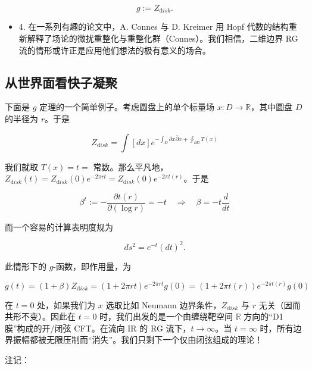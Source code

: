 \documentclass[11pt,a4paper]{ctexart}
\begin{document}
\[g:= Z_{\mathrm disk} .\]

\begin{itemize}
\tightlist
\item
  4. 在一系列有趣的论文中，A. Connes 与 D. Kreimer 用 Hopf 代数的结构重新解释了场论的微扰重整化与重整化群（Connes）。我们相信，二维边界 RG 流的情形或许正是应用他们想法的极有意义的场合。
\end{itemize}

\subsection{从世界面看快子凝聚}\label{ux4eceux4e16ux754cux9762ux770bux5febux5b50ux51ddux805a}

下面是 \(g\) 定理的一个简单例子。考虑圆盘上的单个标量场 \(x:D \to \mathbb{R}\)，其中圆盘 \(D\) 的半径为 \(r\)。于是

\[Z_{\mathrm disk}  =  \int [dx] e^{-\int_D \partial x \bar{\partial} x + \oint_{\partial D}T(x) }\]

我们就取 \(T(x) = t =\) 常数。那么平凡地，\(Z_{\mathrm disk}(t) = Z_{\mathrm disk}(0) e^{-2\pi r t}= Z_{\mathrm disk}(0)e^{-2\pi t(r)}\)。于是

\[\beta^t:= - \frac{\partial t(r)}{\partial(\log r)} = - t \quad \Rightarrow \quad
\beta = - t\frac{d}{dt}\]

而一个容易的计算表明度规为

\[ds^2 = e^{-t} (dt)^2.\]

此情形下的 \(g\)-函数，即作用量，为

\[g(t) =(1+\beta) Z_{\mathrm disk} = (1+2\pi rt)  e^{-2\pi r t}g(0) = (1+2\pi t(r))  e^{-2\pi t(r)} g(0)\]

在 \(t=0\) 处，如果我们为 \(x\) 选取比如 Neumann 边界条件，\(Z_{\mathrm disk}\) 与 \(r\) 无关（因而共形不变）。因此在 \(t=0\) 时，我们出发的是一个由缠绕靶空间 \(\mathbb{R}\) 方向的``D1 膜''构成的开/闭弦 CFT。在流向 IR 的 RG 流下，\(t\to \infty\)。当 \(t=\infty\) 时，所有边界振幅都被无限压制而``消失''。我们只剩下一个仅由闭弦组成的理论！

注记：
\end{document}
